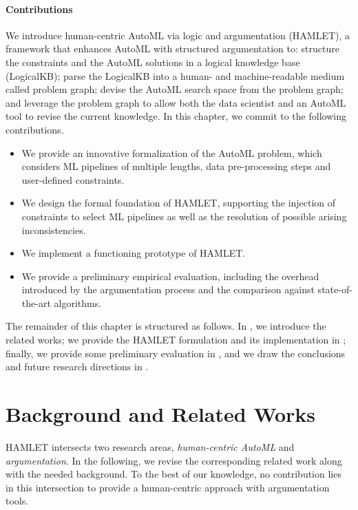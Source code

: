 \paragraph{Contributions}
We introduce human-centric AutoML via logic and argumentation (HAMLET), a framework that enhances AutoML with structured argumentation to:
structure the constraints and the AutoML solutions in a logical knowledge base (LogicalKB);
parse the LogicalKB into a human- and machine-readable medium called problem graph;
devise the AutoML search space from the problem graph;
and leverage the problem graph to allow both the data scientist and an AutoML tool to revise the current knowledge.
In this chapter, we commit to the following contributions.
\begin{itemize}
    \item We provide an innovative formalization of the AutoML problem, which considers ML pipelines of multiple lengths, data pre-processing steps and user-defined constraints.
    \item We design the formal foundation of HAMLET, supporting the injection of constraints to select ML pipelines as well as the resolution of possible arising inconsistencies.
    \item We implement a functioning prototype of HAMLET.
    \item We provide a preliminary empirical evaluation, including the overhead introduced by the argumentation process and the comparison against state-of-the-art algorithms.
\end{itemize}

The remainder of this chapter is structured as follows.
In , we introduce the related works; we provide the HAMLET formulation and its implementation in ; finally, we provide some preliminary evaluation in , and we draw the conclusions and future research directions in .

\section{Background and Related Works}\label{hamlet-sec:related}
HAMLET intersects two research areas, \emph{human-centric AutoML} and \emph{argumentation}.
In the following, we revise the corresponding related work along with the needed background.
To the best of our knowledge, no contribution lies in this intersection to provide a human-centric approach with argumentation tools.

